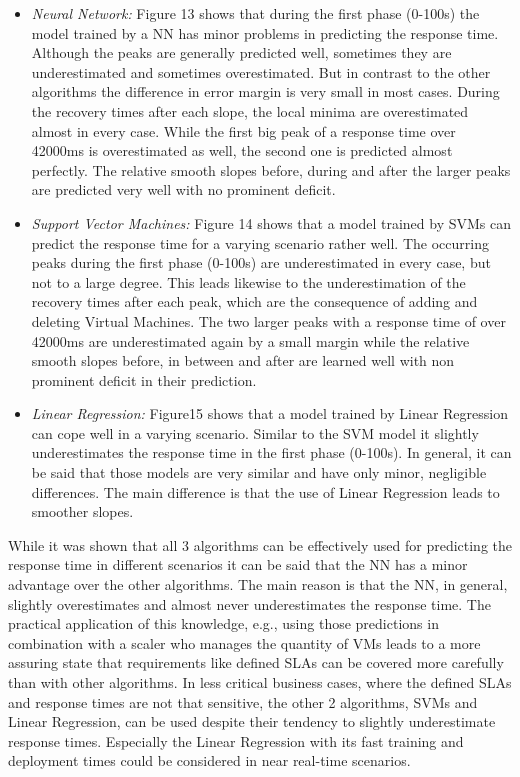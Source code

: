 \begin{itemize}
\item \textit{Neural Network:} Figure 13 shows that during the first phase (0-100s) the model trained by a NN has minor problems in predicting the response time. Although the peaks are generally predicted well, sometimes they are underestimated and sometimes overestimated. But in contrast to the other algorithms the difference in error margin is very small in most cases. During the recovery times after each slope, the local minima are overestimated almost in every case. While the first big peak of a response time over 42000ms is overestimated as well, the second one is predicted almost perfectly. The relative smooth slopes before, during and after the larger peaks are predicted very well with no prominent deficit. 

\item \textit{Support Vector Machines:} Figure 14 shows that a model trained by SVMs can predict the response time for a varying scenario rather well. The occurring peaks during the first phase (0-100s) are underestimated in every case, but not to a large degree. This leads likewise to the underestimation of the recovery times after each peak, which are the consequence of adding and deleting Virtual Machines. The two larger peaks with a response time of over 42000ms are underestimated again by a small margin while the relative smooth slopes before, in between and after are learned well with non prominent deficit in their prediction. 

\item \textit{Linear Regression:} Figure15 shows that a model trained by Linear Regression can cope well in a varying scenario. Similar to the SVM model it slightly underestimates the response time in the first phase (0-100s). In general, it can be said that those models are very similar and have only minor, negligible differences. The main difference is that the use of Linear Regression leads to smoother slopes.
\end{itemize}

While it was shown that all 3 algorithms can be effectively used for predicting the response time in different scenarios it can be said that the NN has a minor advantage over the other algorithms. The main reason is that the NN, in general, slightly overestimates and almost never underestimates the response time. The practical application of this knowledge, e.g., using those predictions in combination with a scaler who manages the quantity of VMs leads to a more assuring state that requirements like defined SLAs can be covered more carefully than with other algorithms. In less critical business cases, where the defined SLAs and response times are not that sensitive, the other 2 algorithms, SVMs and Linear Regression, can be used despite their tendency to slightly underestimate response times. Especially the Linear Regression with its fast training and deployment times could be considered in near real-time scenarios.


